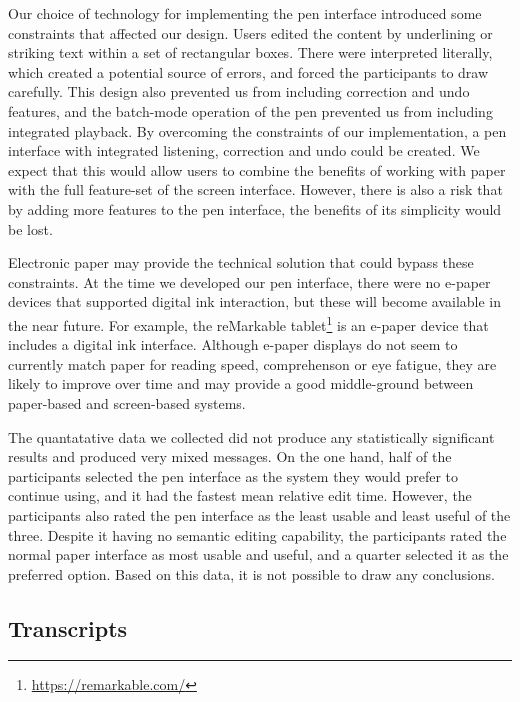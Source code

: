 Our choice of technology for implementing the pen interface introduced some constraints that affected our design.
Users edited the content by underlining or striking text within a set of rectangular boxes. There were interpreted
literally, which created a potential source of errors, and forced the participants to draw carefully. This design also
prevented us from including correction and undo features, and the batch-mode operation of the pen prevented us from
including integrated playback.  By overcoming the constraints of our implementation, a pen interface with integrated
listening, correction and undo could be created. We expect that this would allow users to combine the benefits of
working with paper with the full feature-set of the screen interface. However, there is also a risk that by adding more
features to the pen interface, the benefits of its simplicity would be lost.


Electronic paper may provide the technical solution that could bypass these constraints. At the time we developed our
pen interface, there were no e-paper devices that supported digital ink interaction, but these will become available in
the near future.  For example, the reMarkable tablet\footnote{\url{https://remarkable.com/}} is an e-paper device that
includes a digital ink interface. Although e-paper displays do not seem to currently match paper for reading speed,
comprehenson or eye fatigue, they are likely to improve over time and may provide a good middle-ground between
paper-based and screen-based systems. 

The quantatative data we collected did not produce any statistically significant results and produced very mixed
messages. On the one hand, half of the participants selected the pen interface as the system they would prefer to
continue using, and it had the fastest mean relative edit time. However, the participants also rated the pen interface
as the least usable and least useful of the three.  Despite it having no semantic editing capability, the participants
rated the normal paper interface as most usable and useful, and a quarter selected it as the preferred option.
Based on this data, it is not possible to draw any conclusions.

\subsection{Transcripts}

